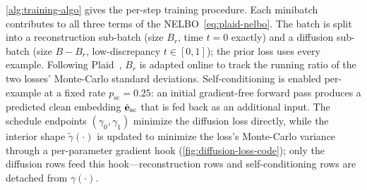 \documentclass{article}
\begin{document}
\cref{alg:training-algo} gives the per-step training procedure. Each minibatch contributes to all three terms of the NELBO~\cref{eq:plaid-nelbo}. The batch is split into a reconstruction sub-batch (size $B_r$, time $t = 0$ exactly) and a diffusion sub-batch (size $B - B_r$, low-discrepancy $t \in [0, 1]$); the prior loss uses every example. Following Plaid~\citep{gulrajani2023plaid}, $B_r$ is adapted online to track the running ratio of the two losses' Monte-Carlo standard deviations. Self-conditioning is enabled per-example at a fixed rate $p_\text{sc} = 0.25$: an initial gradient-free forward pass produces a predicted clean embedding $\hat{{\mathbf e}}_\text{sc}$ that is fed back as an additional input. The schedule endpoints $(\gamma_0, \gamma_1)$ minimize the diffusion loss directly, while the interior shape $\tilde{\gamma}(\cdot)$ is updated to minimize the loss's Monte-Carlo variance through a per-parameter gradient hook (\cref{fig:diffusion-loss-code}); only the diffusion rows feed this hook---reconstruction rows and self-conditioning rows are detached from $\gamma(\cdot)$.
\end{document}
